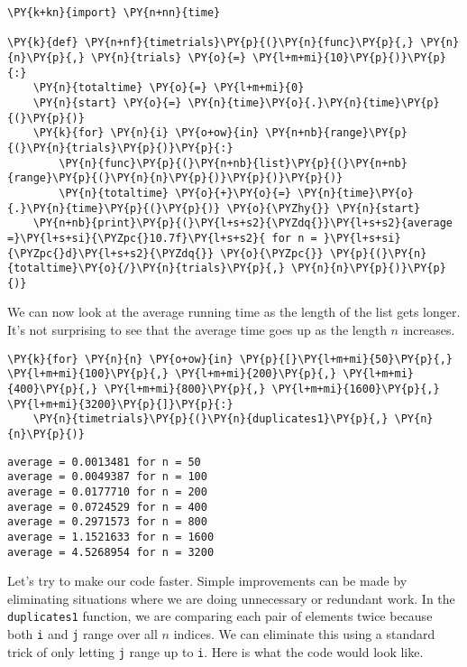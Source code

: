 \begin{Verbatim}[commandchars=\\\{\}]
\PY{k+kn}{import} \PY{n+nn}{time}

\PY{k}{def} \PY{n+nf}{timetrials}\PY{p}{(}\PY{n}{func}\PY{p}{,} \PY{n}{n}\PY{p}{,} \PY{n}{trials} \PY{o}{=} \PY{l+m+mi}{10}\PY{p}{)}\PY{p}{:}
    \PY{n}{totaltime} \PY{o}{=} \PY{l+m+mi}{0}
    \PY{n}{start} \PY{o}{=} \PY{n}{time}\PY{o}{.}\PY{n}{time}\PY{p}{(}\PY{p}{)}
    \PY{k}{for} \PY{n}{i} \PY{o+ow}{in} \PY{n+nb}{range}\PY{p}{(}\PY{n}{trials}\PY{p}{)}\PY{p}{:}
        \PY{n}{func}\PY{p}{(}\PY{n+nb}{list}\PY{p}{(}\PY{n+nb}{range}\PY{p}{(}\PY{n}{n}\PY{p}{)}\PY{p}{)}\PY{p}{)}
        \PY{n}{totaltime} \PY{o}{+}\PY{o}{=} \PY{n}{time}\PY{o}{.}\PY{n}{time}\PY{p}{(}\PY{p}{)} \PY{o}{\PYZhy{}} \PY{n}{start}
    \PY{n+nb}{print}\PY{p}{(}\PY{l+s+s2}{\PYZdq{}}\PY{l+s+s2}{average =}\PY{l+s+si}{\PYZpc{}10.7f}\PY{l+s+s2}{ for n = }\PY{l+s+si}{\PYZpc{}d}\PY{l+s+s2}{\PYZdq{}} \PY{o}{\PYZpc{}} \PY{p}{(}\PY{n}{totaltime}\PY{o}{/}\PY{n}{trials}\PY{p}{,} \PY{n}{n}\PY{p}{)}\PY{p}{)}
\end{Verbatim}



We can now look at the average running time as the length of the list gets longer.
It's not surprising to see that the average time goes up as the length $n$ increases.


\begin{Verbatim}[commandchars=\\\{\}]
\PY{k}{for} \PY{n}{n} \PY{o+ow}{in} \PY{p}{[}\PY{l+m+mi}{50}\PY{p}{,} \PY{l+m+mi}{100}\PY{p}{,} \PY{l+m+mi}{200}\PY{p}{,} \PY{l+m+mi}{400}\PY{p}{,} \PY{l+m+mi}{800}\PY{p}{,} \PY{l+m+mi}{1600}\PY{p}{,} \PY{l+m+mi}{3200}\PY{p}{]}\PY{p}{:}
    \PY{n}{timetrials}\PY{p}{(}\PY{n}{duplicates1}\PY{p}{,} \PY{n}{n}\PY{p}{)}
\end{Verbatim}

\begin{Verbatim}
average = 0.0013481 for n = 50
average = 0.0049387 for n = 100
average = 0.0177710 for n = 200
average = 0.0724529 for n = 400
average = 0.2971573 for n = 800
average = 1.1521633 for n = 1600
average = 4.5268954 for n = 3200
\end{Verbatim}


Let's try to make our code faster.
Simple improvements can be made by eliminating situations where we are doing unnecessary or redundant work.
In the \texttt{duplicates1} function, we are comparing each pair of elements twice because both \texttt{i} and \texttt{j} range over all $n$ indices.
We can eliminate this using a standard trick of only letting \texttt{j} range up to \texttt{i}.
Here is what the code would look like.

